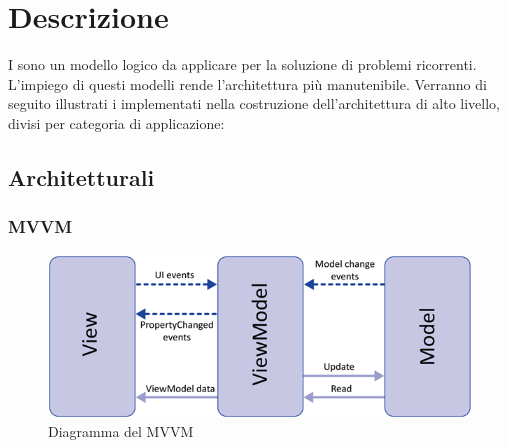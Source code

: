\section{Descrizione  }
I  sono un modello logico da applicare per la soluzione di problemi
ricorrenti. L’impiego di questi modelli rende l'architettura più manutenibile. Verranno
di seguito illustrati i  implementati nella costruzione dell’architettura di
alto livello, divisi per categoria di applicazione:
	\subsection{ Architetturali}

		\subsubsection{MVVM}
		\begin{figure}[H]
		\centering
		\includegraphics[width=0.5\linewidth]{GraficiAppendici/mvvm.png}
		\caption{Diagramma del  MVVM}
	\end{figure}
